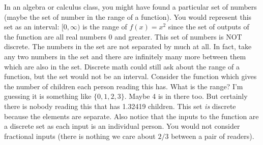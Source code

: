 \documentclass[10pt,]{book}
\theoremstyle{plain}
\theoremstyle{definition}
\theoremstyle{definition}
\theoremstyle{definition}
\begin{document}
    In an algebra or calculus class, you might have found a particular set of numbers (maybe the set of number in the range of a function). You would represent this set as an interval: \([0,\infty)\) is the range of \(f(x) = x^2\) since the set
    of outputs of the function are all real numbers 0 and greater. This set of numbers is NOT discrete. The numbers in the set are not separated by much at all. In fact, take any two numbers in the set and there are infinitely many more between
    them which are also in the set. Discrete math could still ask about the range of a function, but the set would not be an interval. Consider the function which gives the number of children each person reading this has. What is the range? I'm guessing
    it is something like \(\{0, 1, 2, 3\}\). Maybe 4 is in there too. But certainly there is nobody reading this that has 1.32419 children. This set \emph{is} discrete because the elements are separate. Also notice that the inputs to the function
    are a discrete set as each input is an individual person. You would not consider fractional inputs (there is nothing we care about \(2/3\) between a pair of readers).
\par
\end{document}
